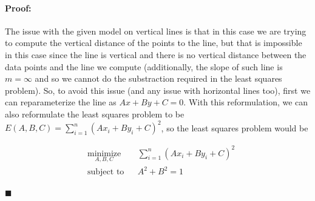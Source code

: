 \documentclass[12pt]{article}
\newenvironment{proof}{\paragraph{Proof: }}{\hfill$\blacksquare$}
\begin{document}
\begin{proof}
The issue with the given model on vertical lines is that in this case we are trying to compute the vertical distance of the points to the line, but that is impossible in this case since the line is vertical and there is no vertical distance between the data points and the line we compute (additionally, the slope of such line is $m = \infty$ and so we cannot do the substraction required in the least squares problem). So, to avoid this issue (and any issue with horizontal lines too), first we can reparameterize the line as $Ax + By + C = 0$. With this reformulation, we can also reformulate the least squares problem to be $E(A,B,C) = \sum_{i=1}^n(Ax_i + By_i + C)^2$, so the least squares problem would be 

\begin{equation*}
\begin{aligned}
& \underset{A,B,C}{\text{minimize}}
& & \sum_{i=1}^n(Ax_i + By_i + C)^2  \\
& \text{subject to}
& & A^2 + B^2 = 1
\end{aligned}
\end{equation*}


\end{proof}
\end{document}
